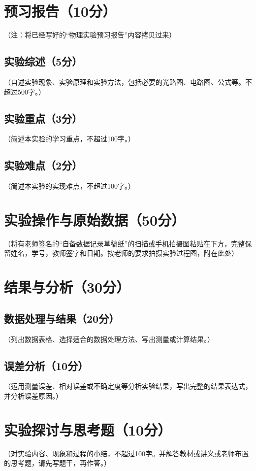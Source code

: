 \documentclass{Phyport}
\begin{document}
\setcounter{page}{1}
\makecover

\section{预习报告（10分）}
（注：将已经写好的“物理实验预习报告”内容拷贝过来）

\subsection{实验综述（5分）}
（自述实验现象、实验原理和实验方法，包括必要的光路图、电路图、公式等。不超过500字。）

\subsection{实验重点（3分）}
（简述本实验的学习重点，不超过100字。）

\subsection{实验难点（2分）}
（简述本实验的实现难点，不超过100字。）

\section{实验操作与原始数据（50分）}
（将有老师签名的“自备数据记录草稿纸”的扫描或手机拍摄图粘贴在下方，完整保留姓名，学号，教师签字和日期。按老师的要求拍摄实验过程图，附在此处）

\section{结果与分析（30分）}
\subsection{数据处理与结果（20分）}
（列出数据表格、选择适合的数据处理方法、写出测量或计算结果。）

\subsection{误差分析（10分）}
（运用测量误差、相对误差或不确定度等分析实验结果，写出完整的结果表达式，并分析误差原因。）

\section{实验探讨与思考题（10分）}
（对实验内容、现象和过程的小结，不超过100字。并解答教材或讲义或老师布置的思考题，请先写题干，再作答。）


\end{document}

